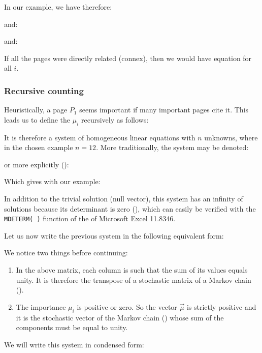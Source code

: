 	In our example, we have therefore:
	
	and:
	
	and:
	
	\begin{tcolorbox}[title=Remark,colframe=black,arc=10pt]
	If all the pages were directly related (connex), then we would have equation for all $i$.
	\end{tcolorbox}
	
	\subsubsection{Recursive counting}
	Heuristically, a page $P_1$ seems important if many important pages cite it. This leads us to define the $\mu_i$ recursively as follows:
	
	It is therefore a system of homogeneous linear equations with $n$ unknowns, where in the chosen example $n=12$. More traditionally, the system may be denoted:
	
	or more explicitly ():
	\setcounter{MaxMatrixCols}{20}
	
	Which gives with our example:
	\setcounter{MaxMatrixCols}{20}
	
	In addition to the trivial solution (null vector), this system has an infinity of solutions because its determinant is zero (), which can easily be verified with the \texttt{MDETERM( )} function of the of Microsoft Excel 11.8346.

	Let us now write the previous system in the following equivalent form:
	\setcounter{MaxMatrixCols}{20}
	
	We notice two things before continuing:
	\begin{enumerate}
		\item In the above matrix, each column is such that the sum of its values equals unity. It is therefore the transpose of a stochastic matrix of a Markov chain ().

		\item The importance $\mu_i$ is positive or zero. So the vector $\vec{\mu}$ is strictly positive and it is the stochastic vector of the Markov chain () whose sum of the components must be equal to unity.
	\end{enumerate}
	We will write this system in condensed form:
	
